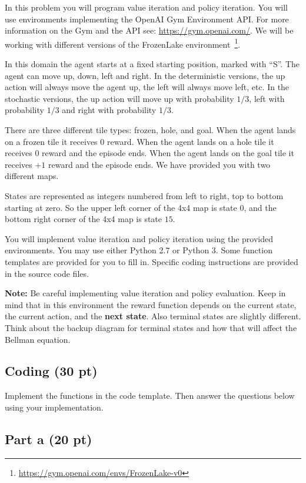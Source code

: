 \documentclass[12pt]{article}
\begin{document}
In this problem you will program value iteration and policy
iteration. You will use environments implementing the OpenAI Gym
Environment API. For more information on the Gym and the API see:
\url{https://gym.openai.com/}. We will be working with different
versions of the FrozenLake
environment~\footnote{\url{https://gym.openai.com/envs/FrozenLake-v0}}.

In this domain the agent starts at a fixed starting position, marked
with ``S''. The agent can move up, down, left and right. In the
deterministic versions, the up action will always move the agent up,
the left will always move left, etc. In the stochastic versions, the
up action will move up with probability $1/3$, left with probability $1/3$
and right with probability $1/3$.

There are three different tile types: frozen, hole, and goal. When the
agent lands on a frozen tile it receives $0$ reward. When the agent
lands on a hole tile it receives $0$ reward and the episode ends. When
the agent lands on the goal tile it receives $+1$ reward and the episode
ends. We have provided you with two different maps.

States are represented as integers numbered from left to right, top to
bottom starting at zero. So the upper left corner of the 4x4 map is
state $0$, and the bottom right corner of the 4x4 map is state $15$.

You will implement value iteration and policy iteration using the
provided environments. You may use either Python 2.7 or Python 3. Some
function templates are provided for you to fill in. Specific coding
instructions are provided in the source code files.

\textbf{Note:} Be careful implementing value iteration and policy
evaluation. Keep in mind that in this environment the reward function
depends on the current state, the current action, and the \textbf{next
state}. Also terminal states are slightly different. Think about the
backup diagram for terminal states and how that will affect the
Bellman equation.

\subsection*{Coding (30 pt)}

Implement the functions in the code template. Then answer the questions below
using your implementation.

\subsection*{Part a (20 pt)}
\end{document}
